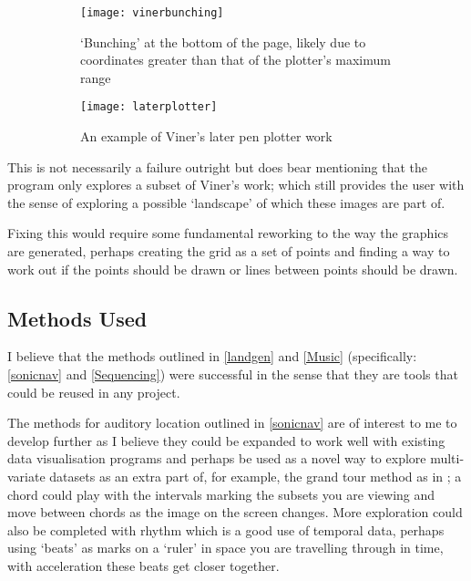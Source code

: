 \begin{figure}[H]
    \centering
    \begin{subfigure}[t]{0.49\textwidth}
        \centering
        \texttt{[image: vinerbunching]}
        \caption{`Bunching' at the bottom of the page, likely due to coordinates
        greater than that of the plotter's maximum range}
    \end{subfigure}
    \hfill
    \begin{subfigure}[t]{0.49\textwidth}
        \centering
        \texttt{[image: laterplotter]}
        \caption{An example of Viner's later pen plotter work}
    \end{subfigure}
    \caption{}
\end{figure}

This is not necessarily a failure outright but does bear mentioning that the
program only explores a subset of Viner's work; which still provides the user
with the sense of exploring a possible `landscape' of which these images are
part of.

Fixing this would require some fundamental reworking to the way the graphics are
generated, perhaps creating the grid as a set of points and finding a way to
work out if the points should be drawn or lines between points should be drawn.

\subsection{Methods Used}
I believe that the methods outlined in \autoref{landgen} and
\autoref{Music} (specifically: \autoref{sonicnav} and
\autoref{Sequencing}) were successful in the sense that they are tools that
could be reused in any project.

The methods for auditory location outlined in \autoref{sonicnav} are of interest
to me to develop further as I believe they could be expanded to work well with
existing data visualisation programs and perhaps be used as a novel way to
explore multi-variate datasets as an extra part of, for example, the grand tour
method as in \citep{asimov1985grand}; a chord could play with the intervals
marking the subsets you are viewing and move between chords as the image on the
screen changes. More exploration could also be completed with rhythm which is a
good use of temporal data, perhaps using `beats' as marks on a `ruler' in space
you are travelling through in time, with acceleration these beats get closer
together.

